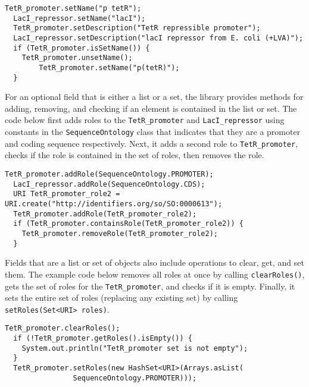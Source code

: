\begin{minipage}{0.95\textwidth} 
\begin{lstlisting}[basicstyle=\footnotesize\ttfamily]
  TetR_promoter.setName("p tetR");
  LacI_repressor.setName("lacI");
  TetR_promoter.setDescription("TetR repressible promoter");
  LacI_repressor.setDescription("lacI repressor from E. coli (+LVA)");
  if (TetR_promoter.isSetName()) {
	TetR_promoter.unsetName();
        TetR_promoter.setName("p(tetR)");
  }
\end{lstlisting}
\end{minipage}

For an optional field that is either a list or a set, the library provides methods for adding, removing, and checking if an element is contained in the list or set.  The code below first adds roles to the \lstinline+TetR_promoter+ and \lstinline+LacI_repressor+ using constants in the
\lstinline+SequenceOntology+ class that indicates that they are a promoter and coding sequence respectively.  Next, it adds a second role to \lstinline+TetR_promoter+, checks if the role is contained in the set of roles, then removes the role.

\begin{minipage}{0.95\textwidth} 
\begin{lstlisting}[basicstyle=\footnotesize\ttfamily]
  TetR_promoter.addRole(SequenceOntology.PROMOTER);		
  LacI_repressor.addRole(SequenceOntology.CDS);
  URI TetR_promoter_role2 = URI.create("http://identifiers.org/so/SO:0000613"); 
  TetR_promoter.addRole(TetR_promoter_role2);
  if (TetR_promoter.containsRole(TetR_promoter_role2)) {
	TetR_promoter.removeRole(TetR_promoter_role2);
  }
\end{lstlisting}
\end{minipage}

Fields that are a list or set of objects also include operations to clear, get, and set them.  The example code below removes all roles at once by calling \lstinline+clearRoles()+, gets the set of roles for the \lstinline+TetR_promoter+, and checks if it is empty.   Finally, it sets the entire set of roles (replacing any existing set) by calling \lstinline+setRoles(Set<URI> roles)+.

\begin{minipage}{0.95\textwidth} 
\begin{lstlisting}[basicstyle=\footnotesize\ttfamily]
  TetR_promoter.clearRoles();
  if (!TetR_promoter.getRoles().isEmpty()) {
	System.out.println("TetR_promoter set is not empty");
  }
  TetR_promoter.setRoles(new HashSet<URI>(Arrays.asList(
 				SequenceOntology.PROMOTER)));
\end{lstlisting}
\end{minipage}

